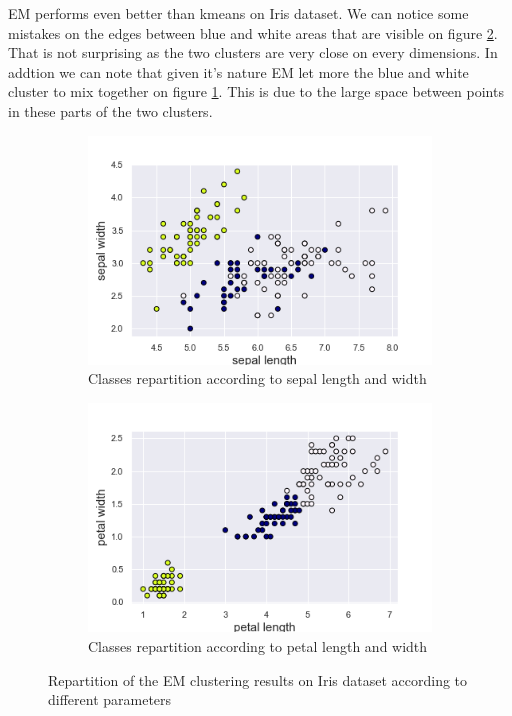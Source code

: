 \documentclass[twocolumn, 10pt]{article}
\begin{document}
			EM performs even better than kmeans on Iris dataset. We can notice some mistakes on the edges between blue and white areas that are visible on figure \ref{fig:iris_EM_pet}. That is not surprising as the two clusters are very close on every dimensions. In addtion we can note that given it's nature EM let more the blue and white cluster to mix together on figure \ref{fig:iris_EM_sep}. This is due to the large space between points in these parts of the two clusters.

			\begin{figure}[h]
				\centering
				\begin{subfigure}[t]{.49\columnwidth}
					\centering
					\includegraphics[width=\linewidth]{../graphics/EM_sepal_length_sepal_width_label.png}
					\caption{Classes repartition according to sepal length and width}
					\label{fig:iris_EM_sep}
				\end{subfigure}
				\begin{subfigure}[t]{.49\columnwidth}
					\centering
					\includegraphics[width=\linewidth]{../graphics/EM_petal_length_petal_width_label.png}
					\caption{Classes repartition according to petal length and width}
					\label{fig:iris_EM_pet}
				\end{subfigure}
				\caption{Repartition of the EM clustering results on Iris dataset according to different parameters}
				\label{fig:iris_EM}
			\end{figure}
\end{document}
